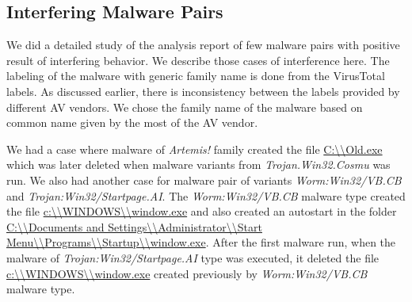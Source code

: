 \subsection{Interfering Malware Pairs}
\label{sub:Interfering Malware Pairs}
We did a detailed study of the analysis report of few malware pairs with positive result of interfering behavior.
We describe those cases of interference here.
The labeling of the malware with generic family name is done from the VirusTotal labels.
As discussed earlier, there is inconsistency between the labels provided by different AV vendors.
We chose the family name of the malware based on common name given by the most of the AV vendor.

We had a case where malware of \emph{Artemis!} family created the file \url{C:\\Old.exe} which was later deleted when malware variants from \emph{Trojan.Win32.Cosmu} was run.
We also had another case for malware pair of variants \emph{Worm:Win32/VB.CB} and \emph{Trojan:Win32/Startpage.AI}.
The \emph{Worm:Win32/VB.CB} malware type created the file \url{c:\\WINDOWS\\window.exe} and also created an autostart in the folder \url{C:\\Documents and Settings\\Administrator\\Start Menu\\Programs\\Startup\\window.exe}.
After the first malware run, when the malware of \emph{Trojan:Win32/Startpage.AI} type was executed, it deleted the file \url{c:\\WINDOWS\\window.exe} created previously by \emph{Worm:Win32/VB.CB} malware type.


